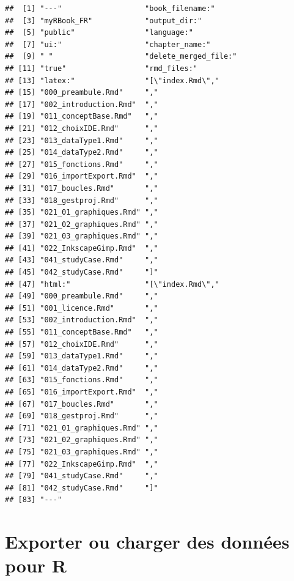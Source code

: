 \documentclass[twoside,symmetric]{book}
\begin{document}
\begin{verbatim}
##  [1] "---"                   "book_filename:"       
##  [3] "myRBook_FR"            "output_dir:"          
##  [5] "public"                "language:"            
##  [7] "ui:"                   "chapter_name:"        
##  [9] " "                     "delete_merged_file:"  
## [11] "true"                  "rmd_files:"           
## [13] "latex:"                "[\"index.Rmd\","      
## [15] "000_preambule.Rmd"     ","                    
## [17] "002_introduction.Rmd"  ","                    
## [19] "011_conceptBase.Rmd"   ","                    
## [21] "012_choixIDE.Rmd"      ","                    
## [23] "013_dataType1.Rmd"     ","                    
## [25] "014_dataType2.Rmd"     ","                    
## [27] "015_fonctions.Rmd"     ","                    
## [29] "016_importExport.Rmd"  ","                    
## [31] "017_boucles.Rmd"       ","                    
## [33] "018_gestproj.Rmd"      ","                    
## [35] "021_01_graphiques.Rmd" ","                    
## [37] "021_02_graphiques.Rmd" ","                    
## [39] "021_03_graphiques.Rmd" ","                    
## [41] "022_InkscapeGimp.Rmd"  ","                    
## [43] "041_studyCase.Rmd"     ","                    
## [45] "042_studyCase.Rmd"     "]"                    
## [47] "html:"                 "[\"index.Rmd\","      
## [49] "000_preambule.Rmd"     ","                    
## [51] "001_licence.Rmd"       ","                    
## [53] "002_introduction.Rmd"  ","                    
## [55] "011_conceptBase.Rmd"   ","                    
## [57] "012_choixIDE.Rmd"      ","                    
## [59] "013_dataType1.Rmd"     ","                    
## [61] "014_dataType2.Rmd"     ","                    
## [63] "015_fonctions.Rmd"     ","                    
## [65] "016_importExport.Rmd"  ","                    
## [67] "017_boucles.Rmd"       ","                    
## [69] "018_gestproj.Rmd"      ","                    
## [71] "021_01_graphiques.Rmd" ","                    
## [73] "021_02_graphiques.Rmd" ","                    
## [75] "021_03_graphiques.Rmd" ","                    
## [77] "022_InkscapeGimp.Rmd"  ","                    
## [79] "041_studyCase.Rmd"     ","                    
## [81] "042_studyCase.Rmd"     "]"                    
## [83] "---"
\end{verbatim}

\hypertarget{l016save}{%
\section{Exporter ou charger des données pour R}\label{l016save}}
\end{document}
